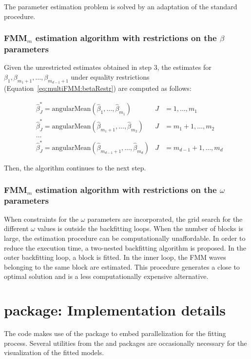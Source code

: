 The parameter estimation problem is solved by an adaptation of the standard procedure.

\subsubsection{FMM$_m$ estimation algorithm with restrictions on the $\beta$ parameters}\label{subsubsec:restFMM:beta}
Given the unrestricted estimates obtained in step $3$, the estimates for $\beta_1, \beta_{m_1+1}, \dots, \beta_{m_{d-1}+1}$ under equality restrictions (Equation~\ref{eq:multiFMM:betaRestr}) are computed as follows:

\begin{align*}
   &\hat{\beta}_J^* = \mathrm{angularMean}\left(\hat{\beta}_1, \dots ,\hat{\beta}_{m_1}\right)& J & = 1, \dots ,m_1 \\
   &\hat{\beta}_J^* = \mathrm{angularMean}\left(\hat{\beta}_{m_1+1}, \dots ,\hat{\beta}_{m_2}\right)& J & = m_1 + 1, \dots ,m_2 \\
   &\dots \\
   &\hat{\beta}_J^* = \mathrm{angularMean}\left(\hat{\beta}_{m_{d-1}+1}, \dots ,\hat{\beta}_{m_d}\right)& J & = m_{d-1} + 1, \dots ,m_d
\end{align*}
  
Then, the algorithm continues to the next step.

\subsubsection{FMM$_m$ estimation algorithm with restrictions on the $\omega$ parameters}\label{subsubsec:restFMM:omega}
When constraints for the $\omega$ parameters are incorporated, the grid search for the different $\omega$ values is outside the backfitting loops. When the number of blocks is large, the estimation procedure can be computationally unaffordable. 
In order to reduce the execution time, a two-nested backfitting algorithm is proposed. 
In the outer backfitting loop, a block is fitted. In the inner loop, the FMM waves belonging to the same block are estimated. This procedure generates a close to optimal solution and is a less computationally expensive alternative. 

\section{ package: Implementation details} \label{sec:implementation}
The  code makes use of the  package \citep{Weston:2020} to embed parallelization for the fitting process. Several utilities from the  \citep{Wickham:2016} and  \citep{Neuwirth:2014} packages are occasionally necessary for the visualization of the fitted models.  

